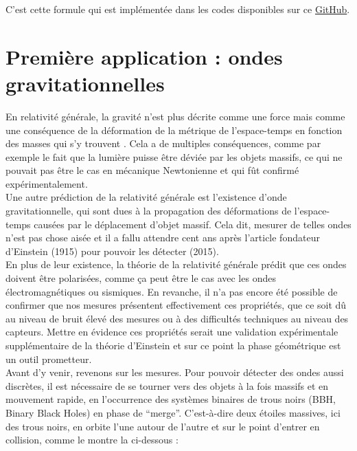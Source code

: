C'est cette formule qui est implémentée dans les codes disponibles sur ce \href{https://github.com/GregoireDoat/StageM2}{GitHub}.
\\



\section{Première application : ondes gravitationnelles} \label{subsec:ex-3D}

En relativité générale, la gravité n'est plus décrite comme une force mais comme une conséquence de la déformation de la métrique de l’espace-temps en fonction des masses qui s'y trouvent \cite{vankov_einsteins_nodate}.
Cela a de multiples conséquences, comme par exemple le fait que la lumière puisse être déviée par les objets massifs, ce qui ne pouvait pas être le cas en mécanique Newtonienne et qui fût confirmé expérimentalement.
\\
Une autre prédiction de la relativité générale est l'existence d'onde gravitationnelle, qui sont dues à la propagation des déformations de l’espace-temps causées par le déplacement d’objet massif.
Cela dit, mesurer de telles ondes n'est pas chose aisée et il a fallu attendre cent ans après l'article fondateur d'Einstein (1915) pour pouvoir les détecter (2015).
\\

En plus de leur existence, la théorie de la relativité générale prédit que ces ondes doivent être polarisées, comme ça peut être le cas avec les ondes électromagnétiques ou sismiques. En revanche, il n'a pas encore été possible de confirmer que nos mesures présentent effectivement ces propriétés, que ce soit dû au niveau de bruit élevé des mesures ou à des difficultés techniques au niveau des capteurs. Mettre en évidence ces propriétés serait une validation expérimentale supplémentaire de la théorie d'Einstein et sur ce point la phase géométrique est un outil prometteur.
\\

Avant d'y venir, revenons sur les mesures. Pour pouvoir détecter des ondes aussi discrètes, il est nécessaire de se tourner vers des objets à la fois massifs et en mouvement rapide, en l'occurrence des systèmes binaires de trous noirs (BBH, Binary Black Holes) en phase de ``merge''. C'est-à-dire deux étoiles massives, ici des trous noirs, en orbite l'une autour de l'autre et sur le point d'entrer en collision, comme le montre la  ci-dessous :

